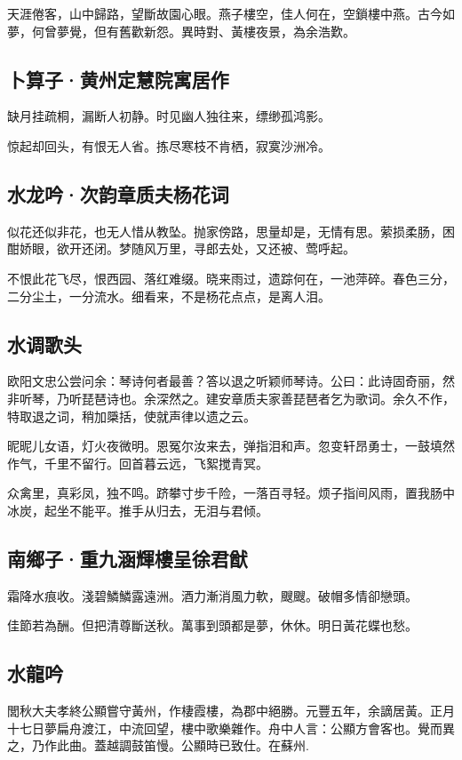 \documentclass[a5paper]{ctexart}
\begin{document}
	天涯倦客，山中歸路，望斷故園心眼。燕子樓空，佳人何在，空鎖樓中燕。古今如夢，何曾夢覺，但有舊歡新怨。異時對、黃樓夜景，為余浩歎。
	
	\subsection{卜算子·黄州定慧院寓居作}
	缺月挂疏桐，漏断人初静。时见幽人独往来，缥缈孤鸿影。　
	
	惊起却回头，有恨无人省。拣尽寒枝不肯栖，寂寞沙洲冷。　
	
	\subsection{水龙吟·次韵章质夫杨花词}
	似花还似非花，也无人惜从教坠。抛家傍路，思量却是，无情有思。萦损柔肠，困酣娇眼，欲开还闭。梦随风万里，寻郎去处，又还被、莺呼起。
	
	不恨此花飞尽，恨西园、落红难缀。晓来雨过，遗踪何在，一池萍碎。春色三分，二分尘土，一分流水。细看来，不是杨花点点，是离人泪。
	
	\subsection{水调歌头}
	\begin{small}
		欧阳文忠公尝问余：琴诗何者最善？答以退之听颖师琴诗。公曰：此诗固奇丽，然非听琴，乃听琵琶诗也。余深然之。建安章质夫家善琵琶者乞为歌词。余久不作，特取退之词，稍加檃括，使就声律以遗之云。
	\end{small}
	
	昵昵儿女语，灯火夜微明。恩冤尔汝来去，弹指泪和声。忽变轩昂勇士，一鼓填然作气，千里不留行。回首暮云远，飞絮搅青冥。
	
	众禽里，真彩凤，独不鸣。跻攀寸步千险，一落百寻轻。烦子指间风雨，置我肠中冰炭，起坐不能平。推手从归去，无泪与君倾。
	
	\subsection{南鄉子·重九涵輝樓呈徐君猷}
	霜降水痕收。淺碧鱗鱗露遠洲。酒力漸消風力軟，颼颼。破帽多情卻戀頭。
	
	佳節若為酬。但把清尊斷送秋。萬事到頭都是夢，休休。明日黃花蝶也愁。
	
	\subsection{水龍吟}
	\begin{small}
		閭秋大夫孝終公顯嘗守黃州，作棲霞樓，為郡中絕勝。元豐五年，余謫居黃。正月十七日夢扁舟渡江，中流回望，樓中歌樂雜作。舟中人言：公顯方會客也。覺而異之，乃作此曲。蓋越調鼓笛慢。公顯時已致仕。在蘇州.
	\end{small}
	
\end{document}
